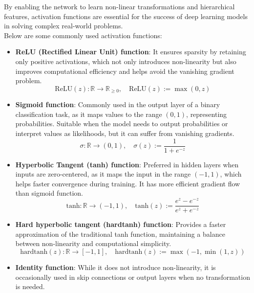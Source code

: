 By enabling the network to learn non-linear transformations and hierarchical features, activation functions are essential for the success of deep learning models in solving complex real-world problems.\\

Below are some commonly used activation functions:
\begin{itemize}
    \item \textbf{ReLU (Rectified Linear Unit) function}: It ensures sparsity by retaining only positive activations, which not only introduces non-linearity but also improves computational efficiency and helps avoid the vanishing gradient problem.\cite{nair2010relu}
    \begin{equation}
        \text{ReLU}(z): \mathbb{R} \to \mathbb{R}_{\geq 0}, \quad \text{ReLU}(z) := \max(0, z)
        \label{eqn:5}
    \end{equation}
    \item \textbf{Sigmoid function}: Commonly used in the output layer of a binary classification task, as it maps values to the range $(0, 1)$, representing probabilities. Suitable when the model needs to output probabilities or interpret values as likelihoods, but it can suffer from vanishing gradients.\cite{hochreiter1997lstm, rumelhart1986learning}
    \begin{equation}
        \sigma: \mathbb{R} \to (0,1), \quad \sigma(z) := \frac{1}{1+e^{-z}}
        \label{eqn:6}
    \end{equation}
    \item \textbf{Hyperbolic Tangent (tanh) function}: Preferred in hidden layers when inputs are zero-centered, as it maps the input in the range $(-1, 1)$, which helps faster convergence during training. It has more efficient gradient flow than sigmoid function.
    \begin{equation}
        \text{tanh}: \mathbb{R} \to (-1,1), \quad \text{tanh}(z) := \frac{e^z-e^{-z}}{e^z+e^{-z}}
        \label{eqn:7}
    \end{equation}
    \item \textbf{Hard hyperbolic tangent (hardtanh) function}: Provides a faster approximation of the traditional tanh function, maintaining a balance between non-linearity and computational simplicity.
    \begin{equation}
        \text{hardtanh}(z): \mathbb{R} \to [-1,1], \quad \text{hardtanh}(z) := \max(-1, \min(1,z))
        \label{eqn:8}
    \end{equation}
    \item \textbf{Identity function}: While it does not introduce non-linearity, it is occasionally used in skip connections or output layers when no transformation is needed.

\end{itemize}
